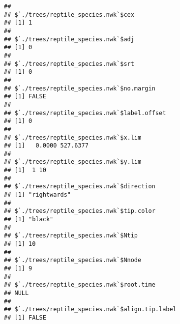 \documentclass[]{article}
\newenvironment{Shaded}{\begin{snugshade}}{\end{snugshade}}
\newcommand{\KeywordTok}[1]{\textcolor[rgb]{0.13,0.29,0.53}{\textbf{#1}}}
\newcommand{\DataTypeTok}[1]{\textcolor[rgb]{0.13,0.29,0.53}{#1}}
\newcommand{\StringTok}[1]{\textcolor[rgb]{0.31,0.60,0.02}{#1}}
\newcommand{\CommentTok}[1]{\textcolor[rgb]{0.56,0.35,0.01}{\textit{#1}}}
\newcommand{\ControlFlowTok}[1]{\textcolor[rgb]{0.13,0.29,0.53}{\textbf{#1}}}
\newcommand{\OperatorTok}[1]{\textcolor[rgb]{0.81,0.36,0.00}{\textbf{#1}}}
\newcommand{\NormalTok}[1]{#1}
\begin{document}
\begin{verbatim}
## 
## $`./trees/reptile_species.nwk`$cex
## [1] 1
## 
## $`./trees/reptile_species.nwk`$adj
## [1] 0
## 
## $`./trees/reptile_species.nwk`$srt
## [1] 0
## 
## $`./trees/reptile_species.nwk`$no.margin
## [1] FALSE
## 
## $`./trees/reptile_species.nwk`$label.offset
## [1] 0
## 
## $`./trees/reptile_species.nwk`$x.lim
## [1]   0.0000 527.6377
## 
## $`./trees/reptile_species.nwk`$y.lim
## [1]  1 10
## 
## $`./trees/reptile_species.nwk`$direction
## [1] "rightwards"
## 
## $`./trees/reptile_species.nwk`$tip.color
## [1] "black"
## 
## $`./trees/reptile_species.nwk`$Ntip
## [1] 10
## 
## $`./trees/reptile_species.nwk`$Nnode
## [1] 9
## 
## $`./trees/reptile_species.nwk`$root.time
## NULL
## 
## $`./trees/reptile_species.nwk`$align.tip.label
## [1] FALSE
\end{verbatim}

\begin{Shaded}
\end{Shaded}
\end{document}
